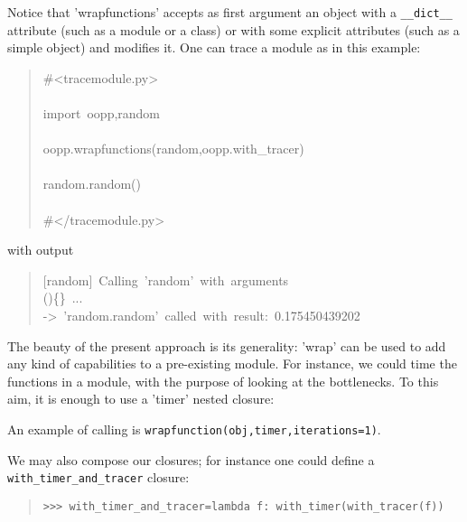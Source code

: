 \documentclass[10pt,english]{article}
\begin{document}
Notice that 'wrapfunctions' accepts as first argument an object with 
a \texttt{{\_}{\_}dict{\_}{\_}} attribute (such as a module or a class) or with some 
explicit attributes (such as a simple object) and modifies it. One can 
trace a module as in this example:
\begin{quote}
\begin{ttfamily}\begin{flushleft}
\mbox{{\#}<tracemodule.py>}\\
\mbox{}\\
\mbox{import~oopp,random}\\
\mbox{}\\
\mbox{oopp.wrapfunctions(random,oopp.with{\_}tracer)~}\\
\mbox{}\\
\mbox{random.random()}\\
\mbox{}\\
\mbox{{\#}</tracemodule.py>}
\end{flushleft}\end{ttfamily}
\end{quote}

with output
\begin{quote}
\begin{ttfamily}\begin{flushleft}
\mbox{[random]~Calling~'random'~with~arguments}\\
\mbox{(){\{}{\}}~...}\\
\mbox{->~'random.random'~called~with~result:~0.175450439202}
\end{flushleft}\end{ttfamily}
\end{quote}

The beauty of the present approach is its generality: 'wrap' can be
used to add any kind of capabilities to a pre-existing module.
For instance, we could time the functions in a module, with the
purpose of looking at the bottlenecks. To this aim, it is enough
to use a 'timer' nested closure:

An example of calling is  \texttt{wrapfunction(obj,timer,iterations=1)}.

We may also compose our closures; for instance one could define a 
\texttt{with{\_}timer{\_}and{\_}tracer} closure:
\begin{quote}
\begin{verbatim}>>> with_timer_and_tracer=lambda f: with_timer(with_tracer(f))\end{verbatim}
\end{quote}
\end{document}
